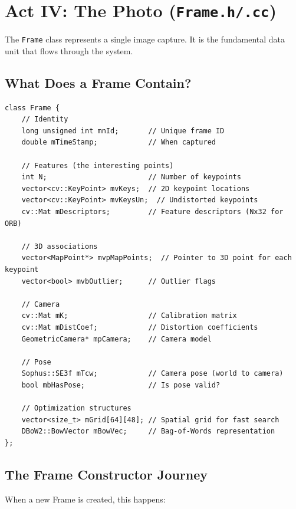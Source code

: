 \section{Act IV: The Photo (\texttt{Frame.h/.cc})}

The \texttt{Frame} class represents a single image capture. It is the fundamental data unit that flows through the system.

\subsection{What Does a Frame Contain?}

\begin{lstlisting}[caption={Key Frame members}]
class Frame {
    // Identity
    long unsigned int mnId;       // Unique frame ID
    double mTimeStamp;            // When captured
    
    // Features (the interesting points)
    int N;                        // Number of keypoints
    vector<cv::KeyPoint> mvKeys;  // 2D keypoint locations
    vector<cv::KeyPoint> mvKeysUn;  // Undistorted keypoints
    cv::Mat mDescriptors;         // Feature descriptors (Nx32 for ORB)
    
    // 3D associations
    vector<MapPoint*> mvpMapPoints;  // Pointer to 3D point for each keypoint
    vector<bool> mvbOutlier;      // Outlier flags
    
    // Camera
    cv::Mat mK;                   // Calibration matrix
    cv::Mat mDistCoef;            // Distortion coefficients
    GeometricCamera* mpCamera;    // Camera model
    
    // Pose
    Sophus::SE3f mTcw;            // Camera pose (world to camera)
    bool mbHasPose;               // Is pose valid?
    
    // Optimization structures
    vector<size_t> mGrid[64][48]; // Spatial grid for fast search
    DBoW2::BowVector mBowVec;     // Bag-of-Words representation
};
\end{lstlisting}

\subsection{The Frame Constructor Journey}

When a new Frame is created, this happens:

